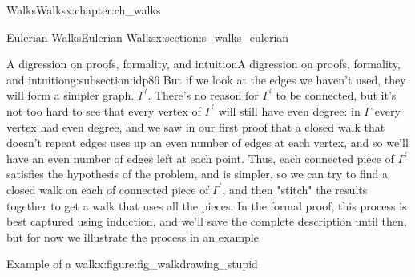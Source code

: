 \documentclass[oneside,10pt,]{book}
\numberwithin{equation}{section}
\begin{document}
\begin{chapterptx}{Walks}{}{Walks}{}{}{x:chapter:ch_walks}
\begin{sectionptx}{Eulerian Walks}{}{Eulerian Walks}{}{}{x:section:s_walks_eulerian}
\begin{subsectionptx}{A digression on proofs, formality, and intuition}{}{A digression on proofs, formality, and intuition}{}{}{g:subsection:idp86}
But if we look at the edges we haven't used, they will form a simpler graph. \(\Gamma^\prime\).  There's no reason for \(\Gamma^\prime\) to be connected, but it's not too hard to see that every vertex of \(\Gamma^\prime\) will still have even degree: in \(\Gamma\) every vertex had even degree, and we saw in our first proof that a closed walk that doesn't repeat edges uses up an even number of edges at each vertex, and so we'll have an even number of edges left at each point.  Thus, each connected piece of \(\Gamma^\prime\) satisfies the hypothesis of the problem, and is simpler, so we can try to find a closed walk on each of connected piece of \(\Gamma^\prime\), and then "stitch" the results together to get a walk that uses all the pieces. In the formal proof, this process is best captured using induction, and we'll save the complete description until then, but for now we illustrate the process in an example%
\begin{figureptx}{Example of a walk}{x:figure:fig_walkdrawing_stupid}{}%
\begin{image}{0.15}{0.7}{0.15}%
\end{image}
\end{figureptx}
\end{subsectionptx}
\end{sectionptx}
\end{chapterptx}
\end{document}
